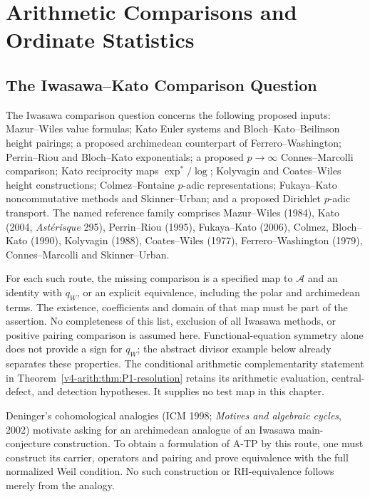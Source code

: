 \section{Arithmetic Comparisons and Ordinate Statistics}
\label{v4-arith:w8-atp:negative}

\subsection{The Iwasawa--Kato Comparison Question}
\label{v4-arith:w8-atp:negative:iwasawa}

\begin{remark}
\label{v4-arith:w8-atp:thm:iwasawa-auxiliary-structure}
The Iwasawa comparison question concerns the following proposed inputs:
Mazur--Wiles value formulas; Kato Euler systems and Bloch--Kato--Beilinson
height pairings; a proposed archimedean counterpart of Ferrero--Washington;
Perrin--Riou and Bloch--Kato exponentials; a proposed $p\to\infty$
Connes--Marcolli comparison; Kato reciprocity maps $\exp^*/\log$;
Kolyvagin and Coates--Wiles height constructions; Colmez--Fontaine
$p$-adic representations; Fukaya--Kato noncommutative methods and
Skinner--Urban; and a proposed Dirichlet $p$-adic transport.
The named reference family comprises Mazur--Wiles (1984), Kato (2004,
\emph{Ast\'{e}risque} 295), Perrin--Riou (1995), Fukaya--Kato (2006),
Colmez, Bloch--Kato (1990), Kolyvagin (1988), Coates--Wiles (1977),
Ferrero--Washington (1979), Connes--Marcolli and Skinner--Urban.

For each such route, the missing comparison is a specified map to
$\mathscr A$ and an identity with $q_W$, or an explicit equivalence,
including the polar and archimedean terms. The existence, coefficients
and domain of that map must be part of the assertion. No completeness
of this list, exclusion of all Iwasawa methods, or positive pairing
comparison is assumed here. Functional-equation symmetry alone does
not provide a sign for $q_W$; the abstract divisor example below already
separates these properties. The conditional arithmetic complementarity
statement in Theorem~\ref{v4-arith:thm:P1-resolution} retains its
arithmetic evaluation, central-defect, and detection hypotheses.
It supplies no test map in this chapter.
\end{remark}

\begin{remark}
\label{v4-arith:w8-atp:rem:deninger-archimedean}
Deninger's cohomological analogies (ICM 1998; \emph{Motives and
algebraic cycles}, 2002) motivate asking for an archimedean analogue
of an Iwasawa main-conjecture construction. To obtain a formulation
of A-TP by this route, one must construct its carrier, operators and
pairing and prove equivalence with the full normalized Weil condition.
No such construction or RH-equivalence follows merely from the analogy.
\end{remark}

